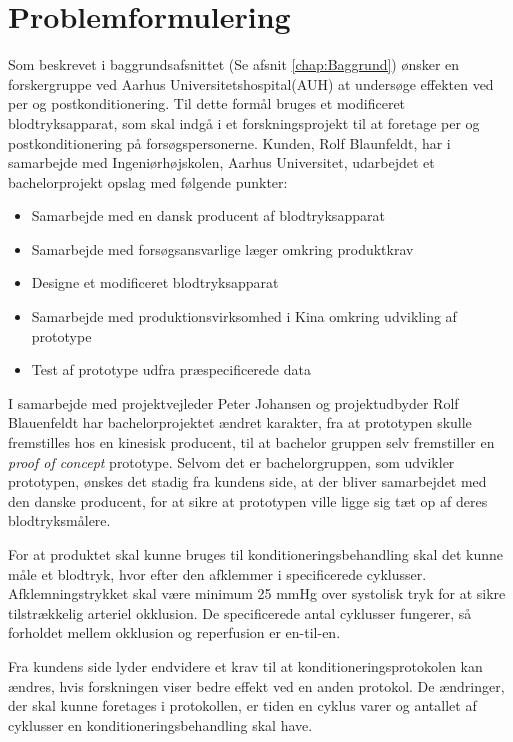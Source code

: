 \chapter{Problemformulering}\label{title:problemformulering}
Som beskrevet i baggrundsafsnittet (Se afsnit \ref{chap:Baggrund}) ønsker en forskergruppe ved Aarhus Universitetshospital(AUH) at undersøge effekten ved per og postkonditionering. Til dette formål bruges et modificeret blodtryksapparat, som skal indgå i et forskningsprojekt til at foretage per og postkonditionering på forsøgspersonerne. Kunden, Rolf Blaunfeldt, har i samarbejde med Ingeniørhøjskolen, Aarhus Universitet, udarbejdet et bachelorprojekt opslag med følgende punkter:
\begin{itemize}
	\item Samarbejde med en dansk producent af blodtryksapparat
	\item Samarbejde med forsøgsansvarlige læger omkring produktkrav
	\item Designe et modificeret blodtryksapparat
	\item Samarbejde med produktionsvirksomhed i Kina omkring udvikling af prototype 
	\item Test af prototype udfra præspecificerede data
\end{itemize}

I samarbejde med projektvejleder Peter Johansen og projektudbyder Rolf Blauenfeldt har bachelorprojektet ændret karakter, fra at prototypen skulle fremstilles hos en kinesisk producent, til at bachelor gruppen selv fremstiller en \textit{proof of concept} prototype. Selvom det er bachelorgruppen, som udvikler prototypen, ønskes det stadig fra kundens side, at der bliver samarbejdet med den danske producent, for at sikre at prototypen ville ligge sig tæt op af deres blodtryksmålere.

For at produktet skal kunne bruges til konditioneringsbehandling skal det kunne måle et blodtryk, hvor efter den afklemmer i specificerede cyklusser. Afklemningstrykket skal være minimum 25 mmHg over systolisk tryk for at sikre tilstrækkelig arteriel okklusion. De specificerede antal cyklusser fungerer, så forholdet mellem okklusion og reperfusion er en-til-en. 

Fra kundens side lyder endvidere et krav til at konditioneringsprotokolen kan ændres, hvis forskningen viser bedre effekt ved en anden protokol. De ændringer, der skal kunne foretages i protokollen, er tiden en cyklus varer og antallet af cyklusser en konditioneringsbehandling skal have. 

